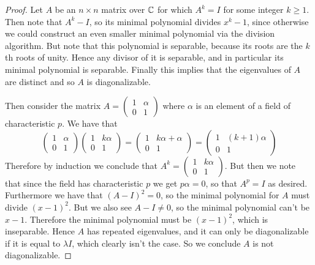 \documentclass[11pt]{article}
\begin{document}
\begin{proof}
  Let $A$ be an $n \times n$ matrix over $\mathbb{C}$ for which $A^k = I$ for some integer $k \ge 1$. Then note that $A^k - I$, so its minimal polynomial divides $x^k - 1$, since otherwise we could construct an even smaller minimal polynomial via the division algorithm.
  But note that this polynomial is separable, because its roots are the $k$th roots of unity.
  Hence any divisor of it is separable, and in particular its minimal polynomial is separable.
  Finally this implies that the eigenvalues of $A$ are distinct and so $A$ is diagonalizable.

  Then consider the matrix $A = \begin{pmatrix}1 & \alpha \\ 0 & 1\end{pmatrix}$ where $\alpha$ is an element of a field of characteristic $p$.
  We have that
  \begin{equation}
    \begin{pmatrix}
      1 & \alpha \\ 0 & 1
    \end{pmatrix}
    \begin{pmatrix}
      1 & k\alpha \\ 0 & 1
    \end{pmatrix} =
    \begin{pmatrix}
      1 & k\alpha + \alpha \\ 0 & 1
    \end{pmatrix} =
    \begin{pmatrix}
      1 & (k+1)\alpha \\ 0 & 1
    \end{pmatrix}
  \end{equation}
  Therefore by induction we conclude that $A^k = \begin{pmatrix}1 & k\alpha \\ 0 & 1\end{pmatrix}$. But then we note that since the field has characteristic $p$ we get $p\alpha = 0$, so that $A^p = I$ as desired.
  Furthermore we have that $(A-I)^2 = 0$, so the minimal polynomial for $A$ must divide $(x-1)^2$.
  But we also see $A-I \ne 0$, so the minimal polynomial can't be $x-1$.
  Therefore the minimal polynomial must be $(x-1)^2$, which is inseparable.
  Hence $A$ has repeated eigenvalues, and it can only be diagonalizable if it is equal to $\lambda I$, which clearly isn't the case. So we conclude $A$ is not diagonalizable.
\end{proof}
\end{document}
